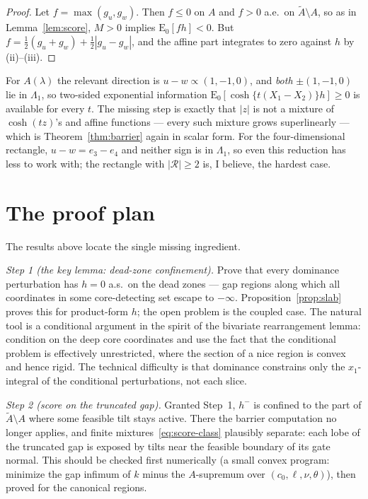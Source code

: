 \documentclass[12pt]{article}
\theoremstyle{remark}
\newcommand{\E}{\mathrm E}
\newcommand{\cR}{\mathcal R}
\newcommand{\wt}{\widetilde}
\begin{document}
\begin{proof}
Let $f=\max(g_u,g_w)$. Then $f\le0$ on $A$ and $f>0$ a.e.\ on
$\wt A\setminus A$, so as in Lemma~\ref{lem:score}, $M>0$ implies
$\E_0[fh]<0$. But $f=\tfrac12(g_u+g_w)+\tfrac12|g_u-g_w|$, and the affine
part integrates to zero against $h$ by (ii)--(iii).
\end{proof}

For $A(\lambda)$ the relevant direction is $u-w\propto(1,-1,0)$, and
\emph{both} $\pm(1,-1,0)$ lie in $\Lambda_1$, so two-sided exponential
information $\E_0[\cosh\{t(X_1-X_2)\}h]\ge0$ is available for every $t$.
The missing step is exactly that $|z|$ is not a mixture of
$\cosh(tz)$'s and affine functions --- every such mixture grows
superlinearly --- which is Theorem~\ref{thm:barrier} again in scalar form.
For the four-dimensional rectangle, $u-w=e_3-e_4$ and neither sign is in
$\Lambda_1$, so even this reduction has less to work with; the rectangle
with $|\cR|\ge2$ is, I believe, the hardest case.

\section{The proof plan}

The results above locate the single missing ingredient.

\emph{Step 1 (the key lemma: dead-zone confinement).} Prove that every
dominance perturbation has $h=0$ a.s.\ on the dead zones --- gap regions
along which all coordinates in some core-detecting set escape to
$-\infty$. Proposition~\ref{prop:slab} proves this for product-form $h$;
the open problem is the coupled case. The natural tool is a conditional
argument in the spirit of the bivariate rearrangement lemma: condition on
the deep core coordinates and use the fact that the conditional problem is
effectively unrestricted, where the section of a nice region is convex and
hence rigid. The technical difficulty is that dominance constrains only
the $x_1$-integral of the conditional perturbations, not each slice.

\emph{Step 2 (score on the truncated gap).} Granted Step~1, $h^-$ is
confined to the part of $\wt A\setminus A$ where some feasible tilt stays
active. There the barrier computation no longer applies, and finite
mixtures~\eqref{eq:score-class} plausibly separate: each lobe of the
truncated gap is exposed by tilts near the feasible boundary of its gate
normal. This should be checked first numerically (a small convex program:
minimize the gap infimum of $k$ minus the $A$-supremum over
$(c_0,\ell,\nu,\theta)$), then proved for the canonical regions.
\end{document}

